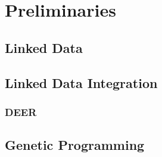 \chapter{Preliminaries}
\section{Linked Data}
\section{Linked Data Integration}
\subsection{DEER}
\section{Genetic Programming}